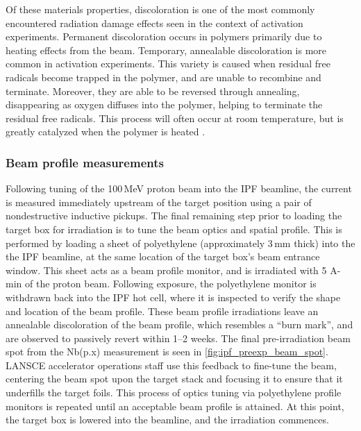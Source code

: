 Of these materials properties, discoloration is one of the most commonly encountered radiation damage effects seen in the context of activation experiments.
Permanent discoloration occurs in polymers primarily due to heating effects from the beam.
Temporary, annealable discoloration is more common in activation experiments.
This variety is caused when residual free radicals become trapped in the polymer, and are unable to recombine and terminate.
Moreover, they are able to be reversed through annealing, disappearing as oxygen diffuses into the polymer, helping to terminate the residual free radicals.
This process will often occur at room temperature, but is greatly catalyzed when the polymer is heated \cite{international1999iaea,Davenas2002}.





\subsubsection{Beam profile measurements}



Following  tuning of the 100\,MeV proton beam into the IPF beamline, the current is measured immediately upstream of the target position using a pair of nondestructive inductive pickups.
The final remaining step prior to loading the  target box for irradiation is to tune the beam optics and spatial profile.
This is performed by loading a sheet of polyethylene (approximately 3\,mm thick) into the the IPF beamline, at the same location of the target box's beam entrance window. 
This sheet acts as a beam profile monitor, and is irradiated with 5 \mmicro A-min of the proton beam.
Following exposure, the polyethylene monitor is withdrawn back into the IPF hot cell, where it is inspected to verify the shape and location of the beam profile.
These beam profile irradiations leave an annealable discoloration of the beam profile, which resembles a \enquote{burn mark}, and are observed to passively revert within 1--2 weeks.
The final pre-irradiation beam spot from the Nb(p.x) measurement is seen in  \autoref{fig:ipf_preexp_beam_spot}.
LANSCE accelerator operations staff use this feedback to fine-tune the beam, centering the beam spot upon the target stack and focusing it to ensure that it underfills the target foils.
This process of  optics tuning via polyethylene profile monitors is repeated until an acceptable beam profile is attained.
At this point, the target box is lowered into the beamline, and the irradiation commences.
 









